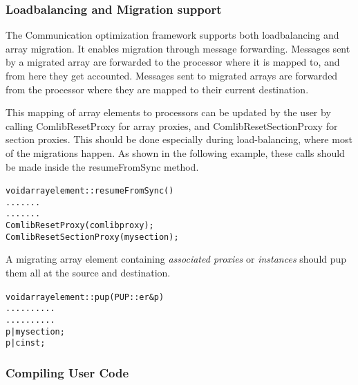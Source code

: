 \subsubsection{Loadbalancing and Migration support}

The Communication optimization framework supports both loadbalancing and array
migration. It enables migration through message forwarding. Messages sent by a
migrated array are forwarded to the processor where it is mapped to, and from
here they get accounted. Messages sent to migrated arrays are forwarded from the
processor where they are mapped to their current destination.

This mapping of array elements to processors can be updated by the user by
calling {\textrm{ComlibResetProxy}} for array proxies, and
{\textrm{ComlibResetSectionProxy}} for section proxies. This should be done
especially during load-balancing, where most of the migrations happen. As shown
in the following example, these calls should be made inside the
{\textrm{resumeFromSync}} method.

\begin{alltt}
  void arrayelement::resumeFromSync() {
      .......
      .......
      ComlibResetProxy(comlibproxy);
      ComlibResetSectionProxy(mysection);
  }
\end{alltt}

A migrating array element containing {\em associated proxies} or {\em
instances} should pup them all at the source and destination.

\begin{alltt}
  void arrayelement::pup(PUP::er &p){
      ..........
      ..........
      p | mysection;
      p | cinst;
  }
\end{alltt}

\subsubsection{Compiling User Code}

